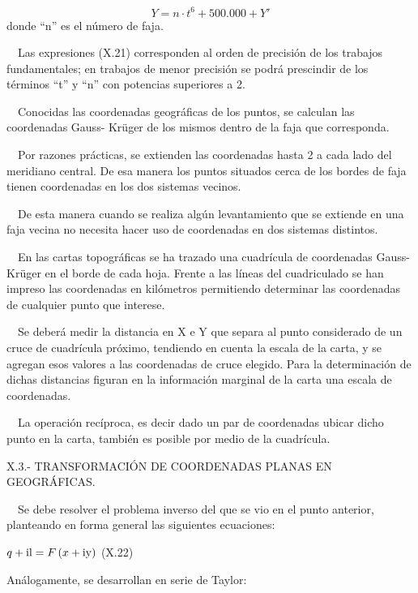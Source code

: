 \documentclass{tufte-book}
\newcommand\normalsubformula[1]{\text{\mathversion{normal}$#1$}}
\begin{document}
\begin{equation*}
{Y=n\cdot t^{{6}}+\text{500}\text{.}\text{000}+Y'}
\end{equation*}
donde {\textquotedblleft}n{\textquotedblright} es el número de faja.

\ \ Las expresiones (X.21) corresponden al orden de precisión de los
trabajos fundamentales; en trabajos de menor precisión se podrá
prescindir de los términos {\textquotedblleft}t{\textquotedblright} y
{\textquotedblleft}n{\textquotedblright} con potencias superiores a 2.

\ \ Conocidas las coordenadas geográficas de los puntos, se calculan
las coordenadas Gauss- Kr\"uger de los mismos dentro de la faja que
corresponda.

\ \ Por razones prácticas, se extienden las coordenadas hasta
2{\textordmasculine} a cada lado del meridiano central. De esa manera
los puntos situados cerca de los bordes de faja tienen coordenadas en
los dos sistemas vecinos.

\ \ De esta manera cuando se realiza algún levantamiento que se
extiende en una faja vecina no necesita hacer uso de coordenadas en dos
sistemas distintos.

\ \ En las cartas topográficas se ha trazado una cuadrícula de
coordenadas Gauss- Kr\"uger en el borde de cada hoja. Frente a las
líneas del cuadriculado se han impreso las coordenadas en
kilómetros permitiendo determinar las coordenadas de cualquier punto
que interese.

\ \ Se deberá medir la distancia en X e Y que separa al punto
considerado de un cruce de cuadrícula próximo, tendiendo en cuenta
la escala de la carta, y se agregan esos valores a las coordenadas de
cruce elegido. Para la determinación de dichas distancias figuran en
la información marginal de la carta una escala de coordenadas.

\ \ La operación recíproca, es decir dado un par de coordenadas
ubicar dicho punto en la carta, también es posible por medio de la
cuadrícula. 

X.3.- TRANSFORMACIÓN DE COORDENADAS PLANAS EN GEOGRÁFICAS.

\ \ Se debe resolver el problema inverso del que se vio en el punto
anterior, planteando en forma general las siguientes ecuaciones:


${q+\normalsubformula{\text{il}}=F\left(x+\normalsubformula{\text{iy}}\right)}$
 (X.22)

Análogamente, se desarrollan en serie de Taylor:
\end{document}
